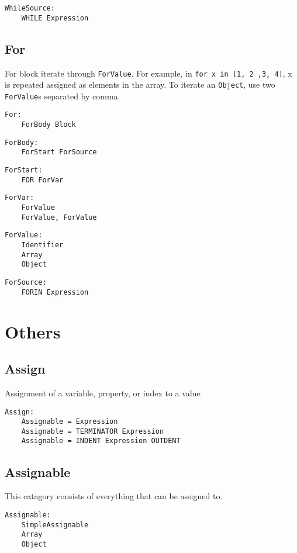\documentclass[10pt]{report}
\begin{document}
\begin{verbatim}
WhileSource:
    WHILE Expression
\end{verbatim}


\subsection{For}
For block iterate through \texttt{ForValue}. For example, in \texttt{for x in [1, 2 ,3, 4]}, x is repeated assigned as elements in the array. To iterate an \texttt{Object}, use two \texttt{ForValue}s separated by comma.
\begin{verbatim}
For:
    ForBody Block
\end{verbatim}

\begin{verbatim}
ForBody:
    ForStart ForSource
\end{verbatim}

\begin{verbatim}
ForStart:
    FOR ForVar
\end{verbatim}

\begin{verbatim}
ForVar:
    ForValue
    ForValue, ForValue
\end{verbatim}

\begin{verbatim}
ForValue:
    Identifier
    Array
    Object
\end{verbatim}

\begin{verbatim}
ForSource:
    FORIN Expression 
\end{verbatim}


\section{Others}

\subsection{Assign}
Assignment of a variable, property, or index to a value
\begin{verbatim}
Assign:
    Assignable = Expression
    Assignable = TERMINATOR Expression
    Assignable = INDENT Expression OUTDENT
\end{verbatim}


\subsection{Assignable}
This catagory consists of everything that can be assigned to.
\begin{verbatim}
Assignable:
    SimpleAssignable
    Array
    Object
\end{verbatim}
\end{document}

